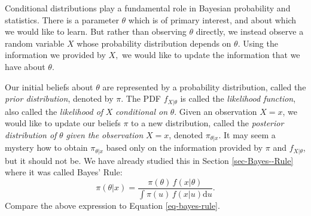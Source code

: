 \documentclass[captions=tableheading]{scrbook}
\begin{document}
Conditional distributions play a fundamental role in Bayesian probability and statistics. There is a parameter \(\theta\) which is of primary interest, and about which we would like to learn. But rather than observing \(\theta\) directly, we instead observe a random variable \(X\) whose probability distribution depends on \(\theta\). Using the information we provided by \(X,\) we would like to update the information that we have about \(\theta\).

Our initial beliefs about \(\theta\) are represented by a probability distribution, called the \emph{prior distribution}, denoted by \(\pi\). The PDF \(f_{X|\theta}\) is called the \emph{likelihood function}, also called the \emph{likelihood of} \(X\) \emph{conditional on} \(\theta\). Given an observation \(X=x\), we would like to update our beliefs \(\pi\) to a new distribution, called the \emph{posterior distribution of} \(\theta\) \emph{given the observation} \(X=x\), denoted \(\pi_{\theta|x}\). It may seem a mystery how to obtain \(\pi_{\theta|x}\) based only on the information provided by \(\pi\) and \(f_{X|\theta}\), but it should not be. We have already studied this in Section \ref{sec-Bayes--Rule} where it was called Bayes' Rule:
\begin{equation} 
\pi(\theta|x)=\frac{\pi(\theta)\, f(x|\theta)}{\int\pi(u)\, f(x|u)\mathrm{d} u}.
\end{equation} 
Compare the above expression to Equation \ref{eq-bayes-rule}.
\end{document}
